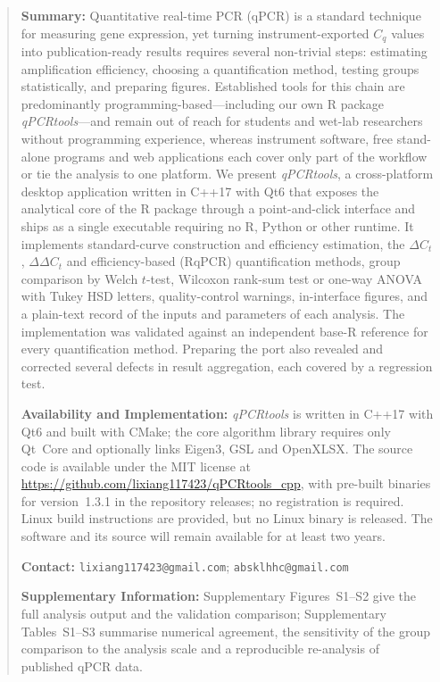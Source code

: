 \begin{abstract}
\sloppy
\textbf{Summary:}
Quantitative real-time PCR (qPCR) is a standard technique for measuring gene
expression, yet turning instrument-exported $C_q$ values into
publication-ready results requires several non-trivial steps: estimating
amplification efficiency, choosing a quantification method, testing groups
statistically, and preparing figures. Established tools for this chain are
predominantly programming-based---including our own R package
\textit{qPCRtools}---and remain out of reach for students and wet-lab
researchers without programming experience, whereas instrument software, free
stand-alone programs and web applications each cover only part of the
workflow or tie the analysis to one platform. We present \textit{qPCRtools},
a cross-platform desktop application written in C++17 with Qt6 that exposes
the analytical core of the R package through a point-and-click interface and
ships as a single executable requiring no R, Python or other runtime. It
implements standard-curve construction and efficiency estimation, the
$\Delta C_t$, $\Delta\Delta C_t$ and efficiency-based (RqPCR) quantification
methods, group comparison by Welch $t$-test, Wilcoxon rank-sum test or
one-way ANOVA with Tukey HSD letters, quality-control warnings,
in-interface figures, and a plain-text record of the inputs and parameters of
each analysis. The implementation was validated against an independent base-R
reference for every quantification method. Preparing the port also revealed
and corrected several defects in result aggregation, each covered by a
regression test.

\textbf{Availability and Implementation:}
\textit{qPCRtools} is written in C++17 with Qt6 and built with CMake; the core
algorithm library requires only Qt~Core and optionally links Eigen3, GSL and
OpenXLSX. The source code is available under the MIT license at
\url{https://github.com/lixiang117423/qPCRtools_cpp}, with pre-built binaries
for version~1.3.1 in the repository releases; no registration is required.
Linux build instructions are provided, but no Linux binary is released. The
software and its source will remain available for at least two years.

\textbf{Contact:} \texttt{lixiang117423@gmail.com};
\texttt{absklhhc@gmail.com}

\textbf{Supplementary Information:} Supplementary Figures~S1--S2 give the full
analysis output and the validation comparison; Supplementary Tables~S1--S3
summarise numerical agreement, the sensitivity of the group comparison to the
analysis scale and a reproducible re-analysis of published qPCR data.
\end{abstract}
